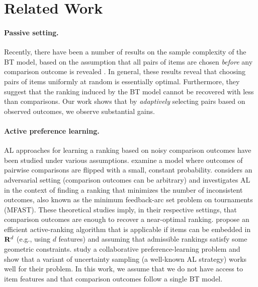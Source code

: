 \section{Related Work}  %
\label{rs:sec:relwork}

\paragraph{Passive setting.}
Recently, there have been a number of results on the sample complexity of the BT model, based on the assumption that all pairs of items are chosen \emph{before} any comparison outcome is revealed
\citep{negahban2012iterative, hajek2014minimax, rajkumar2014statistical, vojnovic2016parameter}.
In general, these results reveal that choosing pairs of items uniformly at random is essentially optimal.
Furthermore, they suggest that the ranking induced by the BT model cannot be recovered with less than  comparisons.
Our work shows that by \emph{adaptively} selecting pairs based on observed outcomes, we observe substantial gains.

\paragraph{Active preference learning.}
AL approaches for learning a ranking based on noisy comparison outcomes have been studied under various assumptions.
\citet{braverman2008noisy} examine a model where outcomes of pairwise comparisons are flipped with a small, constant probability.
\citet{ailon2012active} considers an adversarial setting (comparison outcomes can be arbitrary) and investigates AL in the context of finding a ranking that minimizes the number of inconsistent outcomes, also known as the minimum feedback-arc set problem on tournaments (MFAST).
These theoretical studies imply, in their respective settings, that  comparison outcomes are enough to recover a near-optimal ranking.
\citet{jamieson2011active} propose an efficient active-ranking algorithm that is applicable if items can be embedded in $\mathbf{R}^d$ (e.g., using $d$ features) and assuming that admissible rankings satisfy some geometric constraints.
\citet{wang2014active} study a collaborative preference-learning problem and show that a variant of uncertainty sampling (a well-known AL strategy) works well for their problem.
In this work, we assume that we do not have access to item features and that comparison outcomes follow a single BT model.

